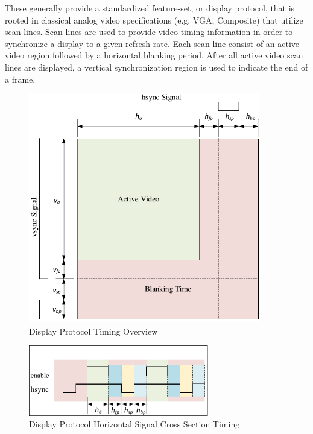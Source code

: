     These generally provide a standardized feature-set, or display protocol, that is rooted in classical analog video specifications (e.g. VGA, Composite)\cite{NIAnalog} that utilize scan lines\cite{Neal1998}. Scan lines are used to provide video timing information in order to synchronize a display to a given refresh rate. Each scan line consist of an active video region followed by a horizontal blanking period. After all active video scan lines are displayed, a vertical synchronization region is used to indicate the end of a frame.

    \begin{figure}
        \centering
        \includegraphics[width=0.9\textwidth]{fig/display_timing_overview.pdf}
        \caption{Display Protocol Timing Overview}
        \label{fig:display_protocol_timing_overview}
    \end{figure}

    \begin{figure}
        \centering
        \includegraphics[width=0.7\textwidth]{fig/display_timing_line_cross.pdf}
        \caption{Display Protocol Horizontal Signal Cross Section Timing}
        \label{fig:display_protocol_line_cross}
    \end{figure}

